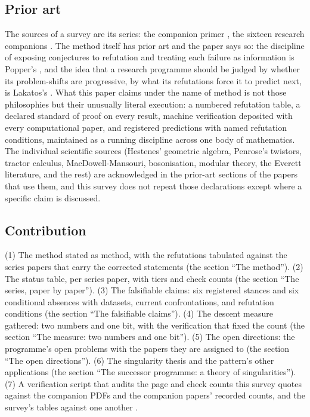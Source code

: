 \documentclass[11pt]{article}
\theoremstyle{definition}
\theoremstyle{plain}
\begin{document}
\subsection*{Prior art}
\label{c:note.programme.setting-prior-art}
The sources of a survey are its series: the companion primer \cite{ButlerT0}, the sixteen research companions \cite{ButlerT1, ButlerT2, ButlerT3, ButlerT4, ButlerT5, ButlerT6, ButlerT7, ButlerT8, ButlerT9, ButlerT10, ButlerT11, ButlerT12, ButlerT13, ButlerT14, ButlerT15, ButlerT16}. The method itself has prior art and the paper says so: the discipline of exposing conjectures to refutation and treating each failure as information is Popper's \cite{Popper1963}, and the idea that a research programme should be judged by whether its problem-shifts are progressive, by what its refutations force it to predict next, is Lakatos's \cite{Lakatos1978}. What this paper claims under the name of method is not those philosophies but their unusually literal execution: a numbered refutation table, a declared standard of proof on every result, machine verification deposited with every computational paper, and registered predictions with named refutation conditions, maintained as a running discipline across one body of mathematics. The individual scientific sources (Hestenes' geometric algebra, Penrose's twistors, tractor calculus, MacDowell-Mansouri, bosonisation, modular theory, the Everett literature, and the rest) are acknowledged in the prior-art sections of the papers that use them, and this survey does not repeat those declarations except where a specific claim is discussed.

\subsection*{Contribution}
\label{c:note.programme.setting-contribution}
(1) The method stated as method, with the refutations tabulated against the series papers that carry the corrected statements (the section ``The method''). (2) The status table, per series paper, with tiers and check counts (the section ``The series, paper by paper''). (3) The falsifiable claims: six registered stances and six conditional absences with datasets, current confrontations, and refutation conditions (the section ``The falsifiable claims''). (4) The descent measure gathered: two numbers and one bit, with the verification that fixed the count (the section ``The measure: two numbers and one bit''). (5) The open directions: the programme's open problems with the papers they are assigned to (the section ``The open directions''). (6) The singularity thesis and the pattern's other applications (the section ``The successor programme: a theory of singularities''). (7) A verification script that audits the page and check counts this survey quotes against the companion PDFs and the companion papers' recorded counts, and the survey's tables against one another \cite{ButlerVerifyT17}.
\end{document}
